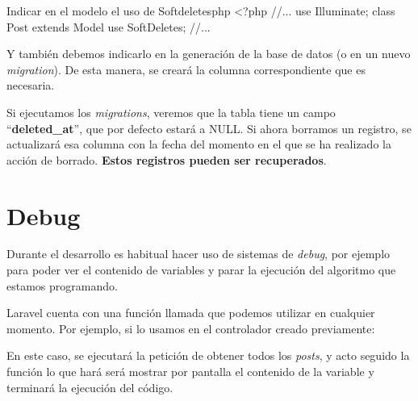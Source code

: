 \begin{mycode}{Indicar en el modelo el uso de Softdeletes}{php}{}
<?php
//...
use Illuminate\Database\Eloquent\SoftDeletes;
class Post extends Model{
    use SoftDeletes;
    //...
}
\end{mycode}

Y también debemos indicarlo en la generación de la base de datos (o en un nuevo \textit{migration}). De esta manera, se creará la columna correspondiente que es necesaria.


Si ejecutamos los \textit{migrations}, veremos que la tabla tiene un campo “\textbf{deleted\_at}”, que por defecto estará a NULL. Si ahora borramos un registro, se actualizará esa columna con la fecha del momento en el que se ha realizado la acción de borrado. \textbf{Estos registros pueden ser recuperados}.



\chapter{Debug}
Durante el desarrollo es habitual hacer uso de sistemas de \textit{debug}, por ejemplo para poder ver el contenido de variables y parar la ejecución del algoritmo que estamos programando.

Laravel cuenta con una función llamada  que podemos utilizar en cualquier momento. Por ejemplo, si lo usamos en el controlador creado previamente:


En este caso, se ejecutará la petición de obtener todos los \textit{posts}, y acto seguido la función  lo que hará será mostrar por pantalla el contenido de la variable y terminará la ejecución del código.


